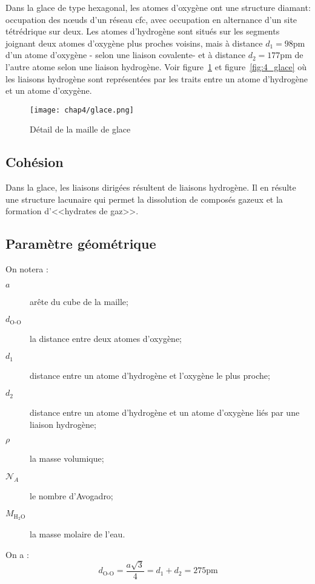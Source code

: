 Dans la glace de type hexagonal, les atomes d’oxygène
ont une structure diamant: occupation des nœuds d’un
réseau cfc, avec occupation en alternance d’un
site tétrédrique sur deux.
Les atomes d’hydrogène sont situés sur les segments
joignant deux atomes d’oxygène plus proches voisins,
mais à distance $d_1=98$pm d’un atome d’oxygène \-- selon
une liaison covalente\-- et à distance $d_2= 177$pm
de l’autre atome selon une liaison hydrogène.
Voir figure~\ref{fig:4_tétraèdre_glace} et
figure~\ref{fig:4_glace} où les liaisons hydrogène sont
représentées par les traits entre un atome d'hydrogène
et un atome d'oxygène.
\begin{figure}
    \centering
    \texttt{[image: chap4/glace.png]}
    \caption{Détail de la maille de glace}
    \label{fig:4_tétraèdre_glace}
\end{figure}

\subsection{Cohésion}
Dans la glace, les liaisons dirigées résultent de liaisons
hydrogène. Il en résulte une structure lacunaire qui permet
la dissolution de composés gazeux et la formation
d’<<hydrates de gaz>>.

\subsection{Paramètre géométrique}
On notera :
\begin{description}
    \item[$a$] arête du cube de la maille;
    \item[$d_\text{O-O}$] la distance entre deux atomes
        d'oxygène;
    \item[$d_1$] distance entre un atome d'hydrogène et
        l'oxygène le plus proche;
    \item[$d_2$] distance entre un atome d'hydrogène
        et un atome d'oxygène liés par une liaison hydrogène;
    \item[$\rho$] la masse volumique;
    \item[$\mathcal{N}_A$] le nombre d'Avogadro;
    \item[$M_{\text{H}_2\text{O}}$] la masse molaire de
        l'eau.
\end{description}
On a :
\begin{equation}
    d_\text{O-O} = \frac{a\sqrt{3}}{4} = d_1 + d_2
    = 275\text{pm}
\end{equation}

